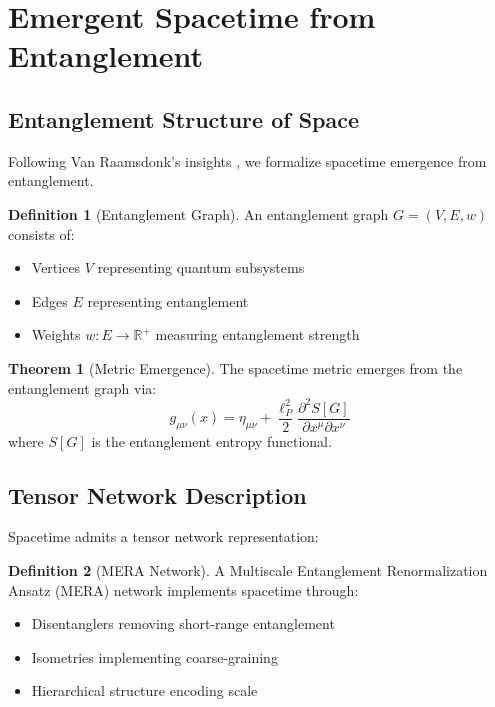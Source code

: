 \documentclass[11pt,a4paper]{article}
\theoremstyle{definition}
\newtheorem{definition}{Definition}[section]
\newtheorem{theorem}{Theorem}[section]
\newcommand{\R}{\mathbb{R}}
\begin{document}
\section{Emergent Spacetime from Entanglement}

\subsection{Entanglement Structure of Space}

Following Van Raamsdonk's insights \cite{VanRaamsdonk2010}, we formalize spacetime emergence from entanglement.

\begin{definition}[Entanglement Graph]
An entanglement graph $G = (V, E, w)$ consists of:
\begin{itemize}
\item Vertices $V$ representing quantum subsystems
\item Edges $E$ representing entanglement
\item Weights $w: E \to \R^+$ measuring entanglement strength
\end{itemize}
\end{definition}

\begin{theorem}[Metric Emergence]
The spacetime metric emerges from the entanglement graph via:
\begin{equation}
g_{\mu\nu}(x) = \eta_{\mu\nu} + \frac{\ell_P^2}{2}\frac{\partial^2 S[G]}{\partial x^\mu \partial x^\nu}
\end{equation}
where $S[G]$ is the entanglement entropy functional.
\end{theorem}

\subsection{Tensor Network Description}

Spacetime admits a tensor network representation:

\begin{definition}[MERA Network]
A Multiscale Entanglement Renormalization Ansatz (MERA) network implements spacetime through:
\begin{itemize}
\item Disentanglers removing short-range entanglement
\item Isometries implementing coarse-graining
\item Hierarchical structure encoding scale
\end{itemize}
\end{definition}
\end{document}
